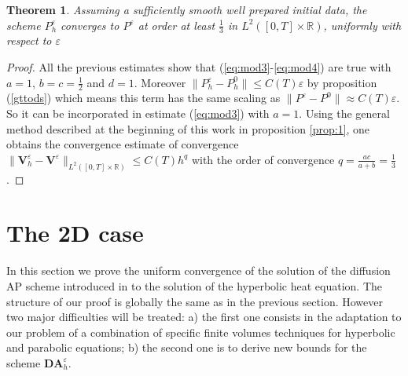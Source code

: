 \documentclass[a4paper,french,english,10pt]{article}
\newcommand\eps{\varepsilon}
\newtheorem{theorem}{Theorem}[section]
\begin{document}
\begin{theorem} \label{theor:1d}
Assuming a sufficiently smooth well prepared initial data,
the scheme $P_h^\eps$ converges to $P^\eps$ at order at least 
$\frac13$ in $L^2([0,T]\times \mathbb{R}   )$, uniformly with respect to $\eps$
\end{theorem}
\begin{proof}
All the previous estimates
show that (\ref{eq:mod3}-\ref{eq:mod4})  are true
with
$a=1$, $b=c=\frac12$ and $d=1$.
Moreover $\|P_h^\varepsilon-P_h^0  \|\leq C(T) \eps $
by proposition (\ref{gttods}) which means this term has the same
scaling as $\|P^\varepsilon-P^0  \|\approx C(T) \eps$.
So it can be  incorporated 
in  estimate (\ref{eq:mod3}) with $a=1$.
Using the general
method described at the beginning of this work in proposition \ref{prop:1}, 
one  obtains the convergence
estimate of convergence
$
\|\mathbf V_h^\eps -\mathbf V^\eps   \|_{L^2([0,T]\times \mathbb{R}   )  }
\leq C(T) h^{ q }
$
with the order of convergence
$
q=\frac{ac}{a+b}=\frac13$.
\end{proof} 

\section{The 2D case}

In this section we prove the uniform 
convergence of the solution of the diffusion
AP 
 scheme introduced in \cite{glaceap} to the solution
of the hyperbolic heat equation.
The structure of our proof  
is globally the same
as in the previous section. However two major  difficulties
will be treated: a) the first one 
consists in  the adaptation to our problem
 of a  combination of specific finite volumes 
techniques for hyperbolic and parabolic equations;
b) the second one is to derive new bounds for the scheme $\mathbf{DA}_h^\eps$.
\end{document}

